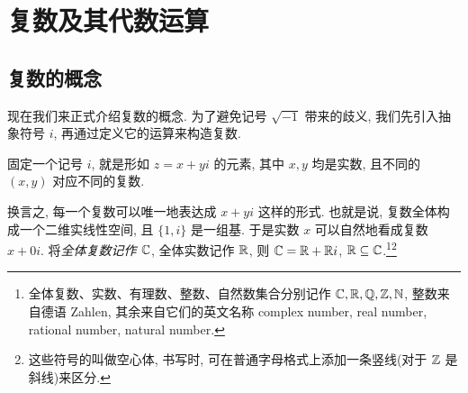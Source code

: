 \section{复数及其代数运算}

\subsection{复数的概念}

现在我们来正式介绍复数的概念.
为了避免记号 $\sqrt{-1}$ 带来的歧义, 我们先引入抽象符号 $i$, 再通过定义它的运算来构造复数.

\begin{definition}[复数]
  固定一个记号 $i$, 就是形如 $z=x+yi$ 的元素, 其中 $x,y$ 均是实数, 且不同的 $(x,y)$ 对应不同的复数.
\end{definition}
换言之, 每一个复数可以唯一地表达成 $x+yi$ 这样的形式.
也就是说, 复数全体构成一个二维实线性空间, 且 $\{1,i\}$ 是一组基.
于是实数 $x$ 可以自然地看成复数 $x+0i$.
将\emph{全体复数记作 ${\mathbb{C}}$}, 全体实数记作 ${\mathbb{R}}$, 则 ${\mathbb{C}}={\mathbb{R}}+{\mathbb{R}} i$, ${\mathbb{R}}\subseteq {\mathbb{C}}$.\footnote{
  全体复数、实数、有理数、整数、自然数集合分别记作 ${\mathbb{C}},{\mathbb{R}},{\mathbb{Q}},{\mathbb{Z}},{\mathbb{N}}$, 整数来自德语 Zahlen, 其余来自它们的英文名称 complex number, real number, rational number, natural number.
}\footnote{
  这些符号的叫做空心体, 书写时, 可在普通字母格式上添加一条竖线(对于 ${\mathbb{Z}}$ 是斜线)来区分.
}

